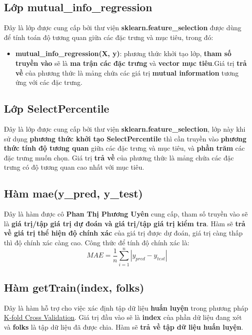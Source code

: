 \documentclass{report}
\begin{document}
\subsection{Lớp mutual\_info\_regression}
    Đây là lớp được cung cấp bởi thư viện \textbf{sklearn.feature\_selection} được dùng để tính toán độ tương quan giữa các đặc trưng và mục tiêu, trong đó:
    \begin{itemize}
        \item \textbf{mutual\_info\_regression(X, y)}: phương thức khởi tạo lớp, \textbf{tham số truyền vào} sẽ là \textbf{ma trận các đặc trưng} và \textbf{vector mục tiêu}.Giá trị \textbf{trả về} của phương thức là mảng chứa các giá trị \textbf{mutual information} tương ứng với các đặc trưng.
    \end{itemize}

\subsection{Lớp SelectPercentile}
    Đây là lớp được cung cấp bởi thư viện \textbf{sklearn.feature\_selection}, lớp này khi sử dụng \textbf{phương thức khởi tạo SelectPercentile} thì cần truyền vào \textbf{phương thức tính độ tương quan} giữa các đặc trưng và mục tiêu, và \textbf{phần trăm} các đặc trưng muốn chọn. Giá trị \textbf{trả về} của phương thức là mảng chứa các đặc trưng có độ tương quan cao nhất với mục tiêu.

\subsection{Hàm mae(y\_pred, y\_test)}\label{sec:mae}
    Đây là hàm được cô \textbf{Phan Thị Phương Uyên} cung cấp, tham số truyền vào sẽ là \textbf{giá trị/tập giá trị dự đoán và giá trị/tập giá trị kiểm tra}. Hàm sẽ \textbf{trả về giá trị thể hiện độ chính xác} của giá trị được dự đoán, giá trị càng thấp thì độ chính xác càng cao. Công thức để tính độ chính xác là:
    \begin{equation}
        MAE = \frac{1}{n}\sum_{i=1}^{n}|y_{pred} - y_{test}|
    \end{equation}


\subsection{Hàm getTrain(index, folks)}\label{sec:getTrain}
    Đây là hàm hỗ trợ cho việc xác định tập dữ liệu \textbf{huấn luyện} trong phương pháp \hyperref[sec:k-fold-cross-validation]{\underline{K-fold Cross Validation}}. Giá trị đầu vào sẽ là \textbf{index} của phần dữ liệu đang xét và \textbf{folks} là tập dữ liệu đã được chia. Hàm sẽ \textbf{trả về tập dữ liệu huấn luyện}.
\end{document}
